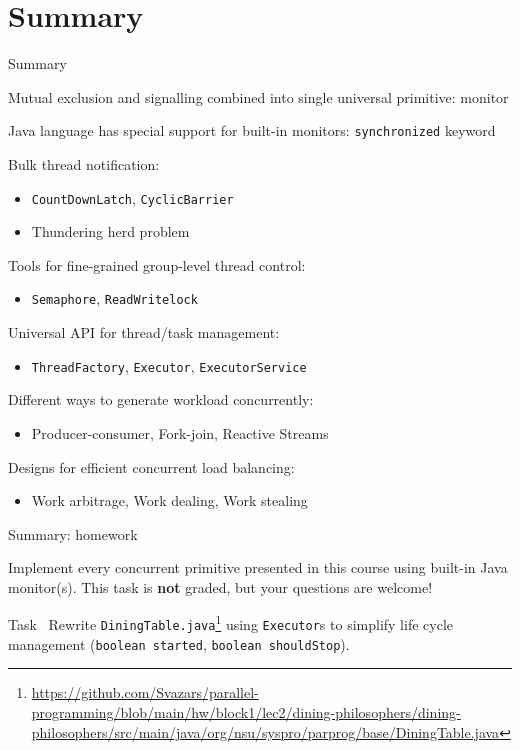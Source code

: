 \section{Summary}

\begin{frame}{Summary}

Mutual exclusion and signalling combined into single universal primitive: monitor

Java language has special support for built-in monitors: \texttt{synchronized} keyword 

Bulk thread notification:
\begin{itemize}
    \item \texttt{CountDownLatch}, \texttt{CyclicBarrier}
    \item Thundering herd problem
\end{itemize}

Tools for fine-grained group-level thread control:
\begin{itemize}
    \item \texttt{Semaphore}, \texttt{ReadWritelock}
\end{itemize}

Universal API for thread/task management:
\begin{itemize}
    \item \texttt{ThreadFactory}, \texttt{Executor}, \texttt{ExecutorService}
\end{itemize}

Different ways to generate workload concurrently:
\begin{itemize}
    \item Producer-consumer, Fork-join, Reactive Streams
\end{itemize}

Designs for efficient concurrent load balancing:
\begin{itemize}
    \item Work arbitrage, Work dealing, Work stealing
\end{itemize}
\end{frame}


\begin{frame}{Summary: homework}

\begin{homeworkmail}{}{
    Implement every concurrent primitive presented in this course using built-in Java monitor(s). This task is \textbf{not} graded, but your questions are welcome!
}
\end{homeworkmail}

\begin{homeworkcode}{Task~\taskRewritePhilosophers}
Rewrite \texttt{DiningTable.java}\footnote{\tiny\url{https://github.com/Svazars/parallel-programming/blob/main/hw/block1/lec2/dining-philosophers/dining-philosophers/src/main/java/org/nsu/syspro/parprog/base/DiningTable.java}} using \texttt{Executor}s to simplify life cycle management (\texttt{boolean started}, \texttt{boolean shouldStop}).
\end{homeworkcode}

\end{frame}



